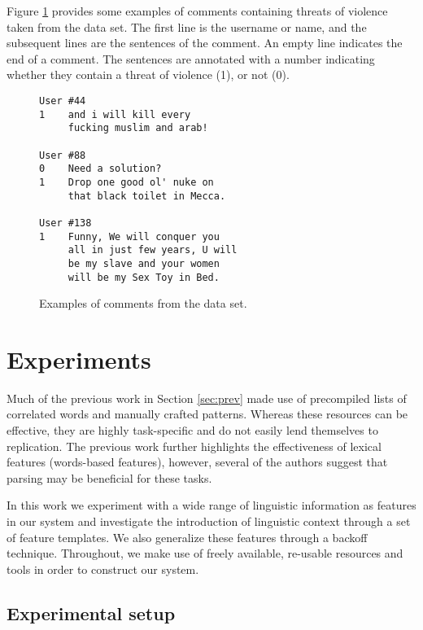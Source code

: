 \documentclass[11pt,letterpaper]{article}
\newcommand{\tov}{threat of violence}
\newcommand{\tovs}{threats of violence}
\begin{document}
Figure \ref{fig:comments} provides some examples of comments containing
\tovs{} taken from the data set. The first line is the username or
name, and the subsequent lines are the sentences of the comment. An
empty line indicates the end of a comment. The sentences are annotated
with a number indicating whether they contain a \tov{} (1), or not
(0).

\begin{figure}
\begin{Verbatim}[fontsize=\small]
User #44
1    and i will kill every
     fucking muslim and arab!

User #88
0    Need a solution?
1    Drop one good ol' nuke on
     that black toilet in Mecca.

User #138
1    Funny, We will conquer you
     all in just few years, U will
     be my slave and your women
     will be my Sex Toy in Bed.
\end{Verbatim}
\caption{Examples of comments from the data set.}
\label{fig:comments}
\end{figure}

\section{Experiments}
\label{sec:exp}
Much of the previous work in Section \ref{sec:prev} made use of
precompiled lists of correlated words and manually crafted
patterns. Whereas these resources can be effective, they are highly
task-specific and do not easily lend themselves to replication.  The
previous work further highlights the effectiveness of lexical features
(words-based features), however, several of the authors suggest that parsing
may be beneficial for these tasks.

In this work we experiment with a wide range of linguistic information
as features in our system and investigate the introduction of
linguistic context through a set of feature templates. We also
generalize these features through a backoff technique. Throughout, we
make use of freely available, re-usable resources and tools in order
to construct our system.


\subsection{Experimental setup}
\end{document}
